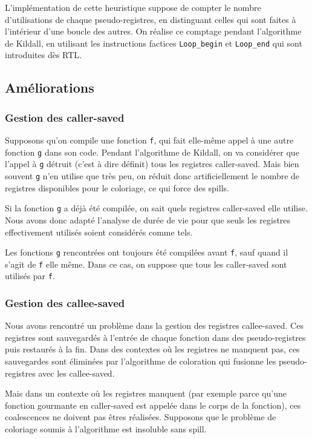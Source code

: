 \documentclass[a4paper]{article}
\begin{document}
L'implémentation de cette heuristique suppose de compter le nombre d'utilisations de chaque pseudo-registres,
en distinguant celles qui sont faites à l'intérieur d'une boucle des autres. On réalise ce comptage pendant
l'algorithme de Kildall, en utilisant les instructions factices \texttt{Loop\_begin} et \texttt{Loop\_end}
qui sont introduites dès RTL.

\subsection{Améliorations}

\subsubsection{Gestion des caller-saved}

Supposons qu'on compile une fonction \texttt{f}, qui fait elle-même appel à une autre fonction
\texttt{g} dans son code. Pendant l'algorithme de Kildall, on va considérer que l'appel à
\texttt{g} détruit (c'est à dire définit) tous les registres caller-saved. Mais bien souvent
\texttt{g} n'en utilise que très peu, on réduit donc artificiellement le nombre de registres
disponibles pour le coloriage, ce qui force des spills.

Si la fonction \texttt{g} a déjà été compilée, on sait quels registres caller-saved elle utilise.
Nous avons donc adapté l'analyse de durée de vie pour que seuls les registres effectivement utilisés
soient considérés comme tels.

Les fonctions \texttt{g} rencontrées ont toujours été compilées avant \texttt{f}, sauf quand il s'agit de
\texttt{f} elle même. Dans ce cas, on suppose que tous les caller-saved sont utilisés par \texttt{f}.

\subsubsection{Gestion des callee-saved}

Nous avons rencontré un problème dans la gestion des registres callee-saved.
Ces registres sont sauvegardés à l'entrée de chaque fonction dans des pseudo-registres puis restaurés à la fin.
Dans des contextes où les registres ne manquent pas, ces sauvegardes sont éliminées par l'algorithme de coloration
qui fusionne les pseudo-registres avec les callee-saved.

Mais dans un contexte où les registres manquent (par exemple parce qu'une fonction gourmante en caller-saved est
appelée dans le corps de la fonction), ces coalescences ne doivent pas êtres réalisées. Supposons que le problème
de coloriage soumis à l'algorithme est insoluble sans spill.
\end{document}
